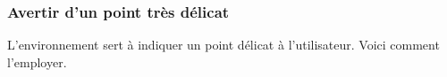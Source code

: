 \documentclass[12pt, a4paper]{article}
\begin{document}

\subsubsection{Avertir d'un point très délicat}

L'environnement  sert à indiquer un point délicat à  l'utilisateur. Voici comment l'employer.

\end{document}
